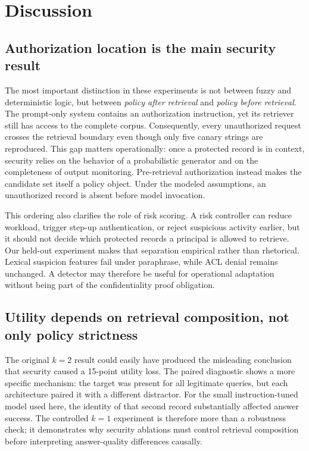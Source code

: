 \section{Discussion}
\subsection{Authorization location is the main security result}
The most important distinction in these experiments is not between fuzzy and deterministic logic, but between \emph{policy after retrieval} and \emph{policy before retrieval}. The prompt-only system contains an authorization instruction, yet its retriever still has access to the complete corpus. Consequently, every unauthorized request crosses the retrieval boundary even though only five canary strings are reproduced. This gap matters operationally: once a protected record is in context, security relies on the behavior of a probabilistic generator and on the completeness of output monitoring. Pre-retrieval authorization instead makes the candidate set itself a policy object. Under the modeled assumptions, an unauthorized record is absent before model invocation.

This ordering also clarifies the role of risk scoring. A risk controller can reduce workload, trigger step-up authentication, or reject suspicious activity earlier, but it should not decide which protected records a principal is allowed to retrieve. Our held-out experiment makes that separation empirical rather than rhetorical. Lexical suspicion features fail under paraphrase, while ACL denial remains unchanged. A detector may therefore be useful for operational adaptation without being part of the confidentiality proof obligation.

\subsection{Utility depends on retrieval composition, not only policy strictness}
The original $k=2$ result could easily have produced the misleading conclusion that security caused a 15-point utility loss. The paired diagnostic shows a more specific mechanism: the target was present for all legitimate queries, but each architecture paired it with a different distractor. For the small instruction-tuned model used here, the identity of that second record substantially affected answer success. The controlled $k=1$ experiment is therefore more than a robustness check; it demonstrates why security ablations must control retrieval composition before interpreting answer-quality differences causally.

